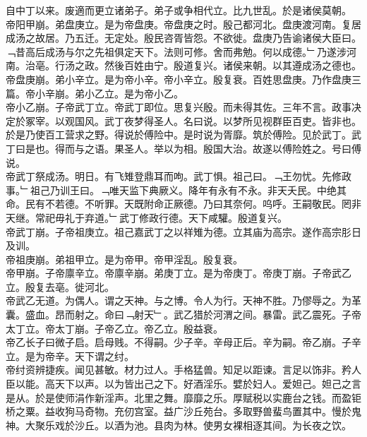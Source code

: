 \documentclass{zhvt-classic}
\begin{document}
\hspace*{2em}自中丁以来。废適而更立诸弟子。弟子或争相代立。比九世乱。於是诸侯莫朝。\\
\hspace*{2em}帝阳甲崩。弟盘庚立。是为帝盘庚。帝盘庚之时。殷己都河北。盘庚渡河南。复居成汤之故居。乃五迁。无定处。殷民咨胥皆怨。不欲徙。盘庚乃告谕诸侯大臣曰。﹁昔高后成汤与尔之先祖俱定天下。法则可修。舍而弗勉。何以成德。﹂乃遂涉河南。治亳。行汤之政。然後百姓由宁。殷道复兴。诸侯来朝。以其遵成汤之德也。\\
\hspace*{2em}帝盘庚崩。弟小辛立。是为帝小辛。帝小辛立。殷复衰。百姓思盘庚。乃作盘庚三篇。帝小辛崩。弟小乙立。是为帝小乙。\\
\hspace*{2em}帝小乙崩。子帝武丁立。帝武丁即位。思复兴殷。而未得其佐。三年不言。政事决定於冢宰。以观国风。武丁夜梦得圣人。名曰说。以梦所见视群臣百吏。皆非也。於是乃使百工营求之野。得说於傅险中。是时说为胥靡。筑於傅险。见於武丁。武丁曰是也。得而与之语。果圣人。举以为相。殷国大治。故遂以傅险姓之。号曰傅说。\\
\hspace*{2em}帝武丁祭成汤。明日。有飞雉登鼎耳而呴。武丁惧。祖己曰。﹁王勿忧。先修政事。﹂祖己乃训王曰。﹁唯天监下典厥义。降年有永有不永。非天夭民。中绝其命。民有不若德。不听罪。天既附命正厥德。乃曰其奈何。呜呼。王嗣敬民。罔非天继。常祀毋礼于弃道。﹂武丁修政行德。天下咸驩。殷道复兴。\\
\hspace*{2em}帝武丁崩。子帝祖庚立。祖己嘉武丁之以祥雉为德。立其庙为高宗。遂作高宗肜日及训。\\
\hspace*{2em}帝祖庚崩。弟祖甲立。是为帝甲。帝甲淫乱。殷复衰。\\
\hspace*{2em}帝甲崩。子帝廪辛立。帝廪辛崩。弟庚丁立。是为帝庚丁。帝庚丁崩。子帝武乙立。殷复去亳。徙河北。\\
\hspace*{2em}帝武乙无道。为偶人。谓之天神。与之博。令人为行。天神不胜。乃僇辱之。为革囊。盛血。昂而射之。命曰﹁射天﹂。武乙猎於河渭之间。暴雷。武乙震死。子帝太丁立。帝太丁崩。子帝乙立。帝乙立。殷益衰。\\
\hspace*{2em}帝乙长子曰微子启。启母贱。不得嗣。少子辛。辛母正后。辛为嗣。帝乙崩。子辛立。是为帝辛。天下谓之纣。\\
\hspace*{2em}帝纣资辨捷疾。闻见甚敏。材力过人。手格猛兽。知足以距谏。言足以饰非。矜人臣以能。高天下以声。以为皆出己之下。好酒淫乐。嬖於妇人。爱妲己。妲己之言是从。於是使师涓作新淫声。北里之舞。靡靡之乐。厚赋税以实鹿台之钱。而盈钜桥之粟。益收狗马奇物。充仞宫室。益广沙丘苑台。多取野兽蜚鸟置其中。慢於鬼神。大聚乐戏於沙丘。以酒为池。县肉为林。使男女裸相逐其间。为长夜之饮。\\
\end{document}
